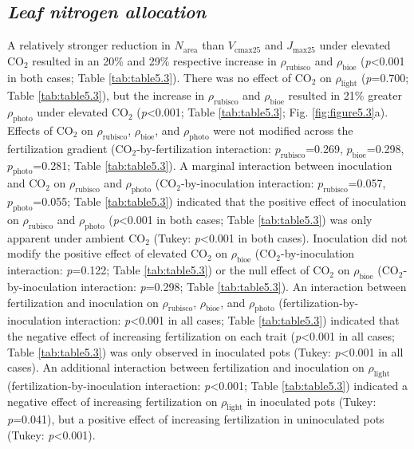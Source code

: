 \subsection{\textit{Leaf nitrogen allocation}}
\noindent A relatively stronger reduction in $N_\mathrm{area}$ than $V_\mathrm{cmax25}$ and $J_\mathrm{max25}$ under elevated CO$_2$ resulted in an 20\% and 29\% respective increase in $\rho_\mathrm{rubisco}$ and $\rho_\mathrm{bioe}$ (\textit{p}<0.001 in both cases; Table \ref{tab:table5.3}). There was no effect of CO$_2$ on $\rho_\mathrm{light}$ (\textit{p}=0.700; Table \ref{tab:table5.3}), but the increase in $\rho_\mathrm{rubisco}$ and $\rho_\mathrm{bioe}$ resulted in 21\% greater $\rho_\mathrm{photo}$ under elevated CO$_2$ (\textit{p}<0.001; Table \ref{tab:table5.3}; Fig. \ref{fig:figure5.3}a). Effects of CO$_2$ on $\rho_\mathrm{rubisco}$, $\rho_\mathrm{bioe}$, and $\rho_\mathrm{photo}$ were not modified across the fertilization gradient (CO$_2$-by-fertilization interaction: $p_\mathrm{rubisco}$=0.269, $p_\mathrm{bioe}$=0.298, $p_\mathrm{photo}$=0.281; Table \ref{tab:table5.3}). A marginal interaction between inoculation and CO$_2$ on $\rho_\mathrm{rubisco}$ and $\rho_\mathrm{photo}$ (CO$_2$-by-inoculation interaction: $p_\mathrm{rubisco}$=0.057, $p_\mathrm{photo}$=0.055; Table \ref{tab:table5.3}) indicated that the  positive effect of inoculation on $\rho_\mathrm{rubisco}$ and $\rho_\mathrm{photo}$ (\textit{p}<0.001 in both cases; Table \ref{tab:table5.3}) was only apparent under ambient CO$_2$ (Tukey: \textit{p}<0.001 in both cases). Inoculation did not modify the positive effect of elevated CO$_2$ on $\rho_\mathrm{bioe}$ (CO$_2$-by-inoculation interaction: \textit{p}=0.122; Table \ref{tab:table5.3}) or the null effect of CO$_2$ on $\rho_\mathrm{bioe}$ (CO$_2$-by-inoculation interaction: \textit{p}=0.298; Table \ref{tab:table5.3}). An interaction between fertilization and inoculation on $\rho_\mathrm{rubisco}$, $\rho_\mathrm{bioe}$, and $\rho_\mathrm{photo}$ (fertilization-by-inoculation interaction: \textit{p}<0.001 in all cases; Table \ref{tab:table5.3}) indicated that the negative effect of increasing fertilization on each trait (\textit{p}<0.001 in all cases; Table \ref{tab:table5.3}) was only observed in inoculated pots (Tukey: \textit{p}<0.001 in all cases). An additional interaction between fertilization and inoculation on $\rho_\mathrm{light}$ (fertilization-by-inoculation interaction: \textit{p}<0.001; Table \ref{tab:table5.3}) indicated a negative effect of increasing fertilization on $\rho_\mathrm{light}$ in inoculated pots (Tukey: \textit{p}=0.041), but a positive effect of increasing fertilization in uninoculated pots (Tukey: \textit{p}<0.001).

